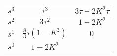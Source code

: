 \begin{tabular}{|c|c|c|}
\hline
$s^3$ & $\tau^3$ & $3\tau-2K^2\tau$\\
\hline 
$s^2$ & $ 3\tau^2 $ & $1-2K^2$ \\
\hline
$s^1$ & $\frac{8}{3}\tau(1-K^2)$ & $0$ \\
\hline
$s^0 $ & $1-2K^2$ & \\
\hline
\end{tabular}
